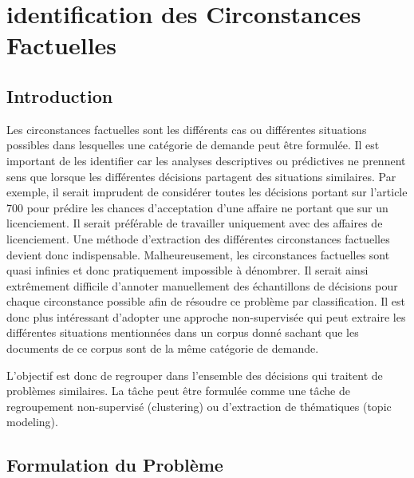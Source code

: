  \chapter{identification des Circonstances Factuelles}
\label{chap:similarite}

% 

\section{Introduction}
\label{sec:similarite:introduction}
Les circonstances factuelles sont les différents cas ou différentes situations possibles dans lesquelles une catégorie de demande peut être formulée. Il est important de les identifier car les analyses descriptives ou prédictives ne prennent sens que lorsque les différentes décisions partagent des situations similaires. Par exemple, il serait imprudent de considérer toutes les décisions portant sur l'article 700 pour prédire les chances d'acceptation d'une affaire ne portant que sur un licenciement. Il serait préférable de travailler uniquement avec des affaires de licenciement. Une méthode d'extraction des différentes circonstances factuelles devient donc indispensable. Malheureusement, les circonstances factuelles sont quasi infinies et donc pratiquement impossible à dénombrer. Il serait ainsi extrêmement difficile d'annoter manuellement des échantillons de décisions pour chaque circonstance possible afin de résoudre ce problème par classification. Il est donc plus intéressant d'adopter une approche non-supervisée qui peut extraire les différentes situations mentionnées dans un corpus donné sachant que les documents de ce corpus sont de la même catégorie de demande.

L’objectif est donc de regrouper dans l’ensemble des décisions qui traitent de problèmes similaires. La tâche peut être formulée comme une tâche de regroupement non-supervisé (clustering) ou d’extraction de thématiques (topic modeling). 
\section{Formulation du Problème}
\label{sec:similarite:probleme}



